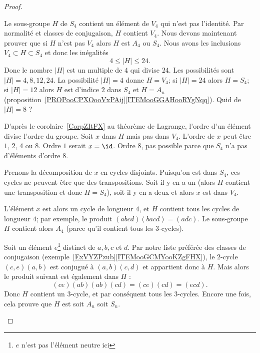 \begin{proof}
\begin{subproof}
\begin{subproof}
			\spitem[Si \( n=4\)]

			Le sous-groupe \( H\) de \( S_4\) contient un élément de \( V_4\) qui n'est pas l'identité. Par normalité et classes de conjugaison, \( H\) contient \( V_4\). Nous devons maintenant prouver que si \( H\) n'est pas \( V_4\) alors \( H\) est \( A_4\) ou \( S_4\). Nous avons les inclusions \( V_4\subset H\subset S_4\) et donc les inégalités
			\begin{equation}
				4\leq | H |\leq 24.
			\end{equation}
			Donc le nombre \( | H |\) est un multiple de \( 4\) qui divise \( 24\). Les possibilités sont \( | H |=4,8,12,24\). La possibilité \( | H |=4\) donne \( H=V_4\); si \( |H |=24\) alors \( H=S_4\); si \( | H |=12\) alors \( H\) est d'indice \( 2\) dans \( S_4\) et \( H=A_n\) (proposition~\ref{PROPooCPXOooVxPAij}\ref{ITEMooGGAHooRYgNqq}). Quid de \( | H |=8\) ?

			D'après le corolaire~\ref{CorpZItFX} au théorème de Lagrange, l'ordre d'un élément divise l'ordre du groupe. Soit \( x\) dans \( H\) mais pas dans \( V_4\). L'ordre de \( x\) peut être \( 1\), \( 2\), \( 4\) ou \( 8\). Ordre \( 1\) serait \( x=\id\). Ordre \( 8\), pas possible parce que \( S_4\) n'a pas d'éléments d'ordre \( 8\).
			\begin{subproof}
				\spitem[\( x\) d'ordre \( 2\)]

				Prenons la décomposition de \( x\) en cycles disjoints. Puisqu'on est dans \( S_4\), ces cycles ne peuvent être que des transpositions. Soit il y en a un (alors \( H\) contient une transposition et donc \( H=S_4\)), soit il y en a deux et alors \( x\) est dans \( V_4\).

				\spitem[\( x\) d'ordre \( 4\)]

				L'élément \( x\) est alors un cycle de longueur \( 4\), et \( H\) contient tous les cycles de longueur \( 4\); par exemple, le produit \( (abcd)(bacd)=(adc)\). Le sous-groupe \( H\) contient alors \( A_4\) (parce qu'il contient tous les \( 3\)-cycles).
			\end{subproof}

			\spitem[Si \( n\geq 5\)]

			Soit un élément \( e\)\footnote{\( e\) n'est pas l'élément neutre ici} distinct de \( a,b,c\) et \( d\). Par notre liste préférée des classes de conjugaison (exemple~\ref{ExVYZPzub}\ref{ITEMooGCMYooKZgFHX}), le \( 2\)-cycle \( (c,e)(a,b)\) est conjugué à \( (a,b)(c,d)\) et appartient donc à \( H\). Mais alors le produit suivant est également dans \( H\) :
			\begin{equation}
				(ce)(ab)(ab)(cd)=(ce)(cd)=(ecd).
			\end{equation}
			Donc \( H\) contient un \( 3\)-cycle, et par conséquent tous les \( 3\)-cycles. Encore une fois, cela prouve que \( H\) est soit \( A_n\) soit \( S_n\).


\end{subproof}
\end{subproof}
\end{proof}
